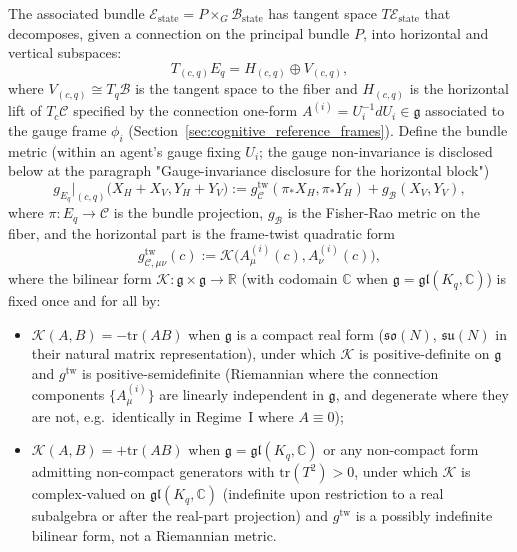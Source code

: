 \documentclass[11pt]{article}
\begin{document}
The associated bundle $\mathcal{E}_{\mathrm{state}} = P \times_G \mathcal{B}_{\mathrm{state}}$ has tangent space $T\mathcal{E}_{\mathrm{state}}$ that decomposes, given a connection on the principal bundle $P$, into horizontal and vertical subspaces:
\begin{equation}
T_{(c, q)} E_q = H_{(c, q)} \oplus V_{(c, q)},
\end{equation}
where $V_{(c, q)} \cong T_q \mathcal{B}$ is the tangent space to the fiber and $H_{(c, q)}$ is the horizontal lift of $T_c \mathcal{C}$ specified by the connection one-form $A^{(i)} = U_i^{-1}dU_i \in \mathfrak{g}$ associated to the gauge frame $\phi_i$ (Section~\ref{sec:cognitive_reference_frames}). Define the bundle metric (within an agent's gauge fixing $U_i$; the gauge non-invariance is disclosed below at the paragraph "Gauge-invariance disclosure for the horizontal block")
\begin{equation}
g_{E_q}\big|_{(c, q)}\big(X_H + X_V, Y_H + Y_V\big) := g_{\mathcal{C}}^{\mathrm{tw}}(\pi_* X_H, \pi_* Y_H) + g_{\mathcal{B}}(X_V, Y_V),
\label{eq:bundle_metric}
\end{equation}
where $\pi: E_q \to \mathcal{C}$ is the bundle projection, $g_{\mathcal{B}}$ is the Fisher-Rao metric on the fiber, and the horizontal part is the frame-twist quadratic form
\begin{equation}
g_{\mathcal{C},\mu\nu}^{\mathrm{tw}}(c) := \mathcal{K}\big(A^{(i)}_\mu(c), A^{(i)}_\nu(c)\big),
\label{eq:horizontal_metric}
\end{equation}
where the bilinear form $\mathcal{K}: \mathfrak{g} \times \mathfrak{g} \to \mathbb{R}$ (with codomain $\mathbb{C}$ when $\mathfrak{g} = \mathfrak{gl}(K_q, \mathbb{C})$) is fixed once and for all by:
\begin{itemize}
\item $\mathcal{K}(A, B) = -\mathrm{tr}(AB)$ when $\mathfrak{g}$ is a compact real form ($\mathfrak{so}(N)$, $\mathfrak{su}(N)$ in their natural matrix representation), under which $\mathcal{K}$ is positive-definite on $\mathfrak{g}$ and $g^{\mathrm{tw}}$ is positive-semidefinite (Riemannian where the connection components $\{A^{(i)}_\mu\}$ are linearly independent in $\mathfrak{g}$, and degenerate where they are not, e.g.\ identically in Regime~I where $A \equiv 0$);
\item $\mathcal{K}(A, B) = +\mathrm{tr}(AB)$ when $\mathfrak{g} = \mathfrak{gl}(K_q, \mathbb{C})$ or any non-compact form admitting non-compact generators with $\mathrm{tr}(T^2) > 0$, under which $\mathcal{K}$ is complex-valued on $\mathfrak{gl}(K_q, \mathbb{C})$ (indefinite upon restriction to a real subalgebra or after the real-part projection) and $g^{\mathrm{tw}}$ is a possibly indefinite bilinear form, not a Riemannian metric.
\end{itemize}
\end{document}
